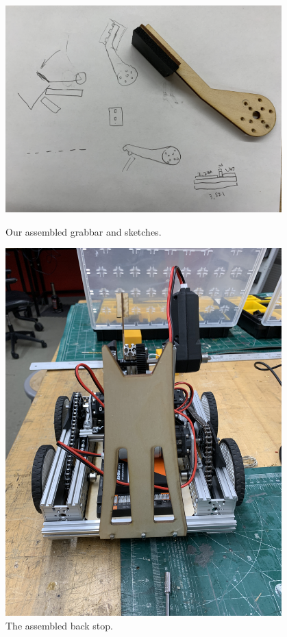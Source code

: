 \begin{figure}[ht]
\centering
\begin{minipage}[b]{.48\textwidth}
  \centering
  \includegraphics[width=0.95\textwidth]{Meetings/October/10-11-21/10-11-21_Hardware_Figure5 - Nathan Forrer.JPG}
  \caption{Our assembled grabbar and sketches.}
  \label{fig:pic5}
\end{minipage}%
\hfill%
\begin{minipage}[b]{.48\textwidth}
  \centering
  \includegraphics[width=0.95\textwidth]{Meetings/October/10-11-21/10-11-21_Hardware_Figure6 - Nathan Forrer.JPG}
  \caption{The assembled back stop.}
  \label{fig:pic6}
\end{minipage}
\end{figure}


